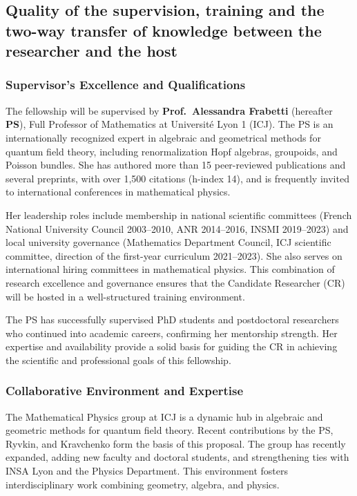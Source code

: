 \documentclass[11pt]{msca-pf}
\begin{document}
\subsection{Quality of the supervision, training and the two-way transfer of
    knowledge between the researcher and the host}
\label{ssc:excellence: supervision}


\subsubsection*{Supervisor’s Excellence and Qualifications}
The fellowship will be supervised by \textbf{Prof.~Alessandra Frabetti} (hereafter \textbf{PS}), Full Professor of Mathematics at Université Lyon 1 (ICJ). The PS is an internationally recognized expert in algebraic and geometrical methods for quantum field theory, including renormalization Hopf algebras, groupoids, and Poisson bundles. She has authored more than 15 peer-reviewed publications and several preprints, with over 1,500 citations (h-index 14), and is frequently invited to international conferences in mathematical physics.

Her leadership roles include membership in national scientific committees (French National University Council 2003–2010, ANR 2014–2016, INSMI 2019–2023) and local university governance (Mathematics Department Council, ICJ scientific committee, direction of the first-year curriculum 2021–2023). She also serves on international hiring committees in mathematical physics. This combination of research excellence and governance ensures that the Candidate Researcher (CR) will be hosted in a well-structured training environment.

The PS has successfully supervised PhD students and postdoctoral researchers who continued into academic careers, confirming her mentorship strength. Her expertise and availability provide a solid basis for guiding the CR in achieving the scientific and professional goals of this fellowship.

\subsubsection*{Collaborative Environment and Expertise}
The Mathematical Physics group at ICJ is a dynamic hub in algebraic and geometric methods for quantum field theory. Recent contributions by the PS, Ryvkin, and Kravchenko form the basis of this proposal. The group has recently expanded, adding new faculty and doctoral students, and strengthening ties with INSA Lyon and the Physics Department. This environment fosters interdisciplinary work combining geometry, algebra, and physics.
\end{document}
